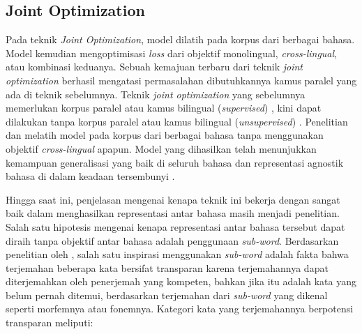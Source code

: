     \subsection{Joint Optimization}
    Pada teknik \textit{Joint Optimization}, model dilatih pada korpus dari berbagai bahasa. Model kemudian mengoptimisasi \textit{loss} dari objektif monolingual, \textit{cross-lingual}, atau kombinasi keduanya. Sebuah kemajuan terbaru dari teknik \textit{joint optimization} berhasil mengatasi permasalahan dibutuhkannya kamus paralel yang ada di teknik sebelumnya. Teknik \textit{joint optimization} yang sebelumnya memerlukan korpus paralel atau kamus bilingual (\textit{supervised}) \parencite{Xing_Wang_Liu_Lin}, kini dapat dilakukan tanpa korpus paralel atau kamus bilingual (\textit{unsupervised}) \parencite{Devlin_Chang_Lee_Toutanova_2019} \parencite{LampleConneau2019}. Penelitian \parencite{Devlin_Chang_Lee_Toutanova_2019} dan \parencite{Conneau_XLMR} melatih model pada korpus dari berbagai bahasa tanpa menggunakan objektif \textit{cross-lingual} apapun. Model yang dihasilkan telah menunjukkan kemampuan generalisasi yang baik di seluruh bahasa dan representasi agnostik bahasa di dalam keadaan tersembunyi \parencite{Pires_Schlinger_Garrette_2019}.

    Hingga saat ini, penjelasan mengenai kenapa teknik ini bekerja dengan sangat baik dalam menghasilkan representasi antar bahasa masih menjadi penelitian. Salah satu hipotesis mengenai kenapa representasi antar bahasa tersebut dapat diraih tanpa objektif antar bahasa adalah penggunaan \textit{sub-word}. Berdasarkan penelitian oleh \parencite{Sennrich_Haddow_Birch_2016}, salah satu inspirasi menggunakan \textit{sub-word} adalah fakta bahwa terjemahan beberapa kata bersifat transparan karena terjemahannya dapat diterjemahkan oleh penerjemah yang kompeten, bahkan jika itu adalah kata yang belum pernah ditemui, berdasarkan terjemahan dari \textit{sub-word} yang dikenal seperti morfemnya atau fonemnya. Kategori kata yang terjemahannya berpotensi transparan meliputi:

